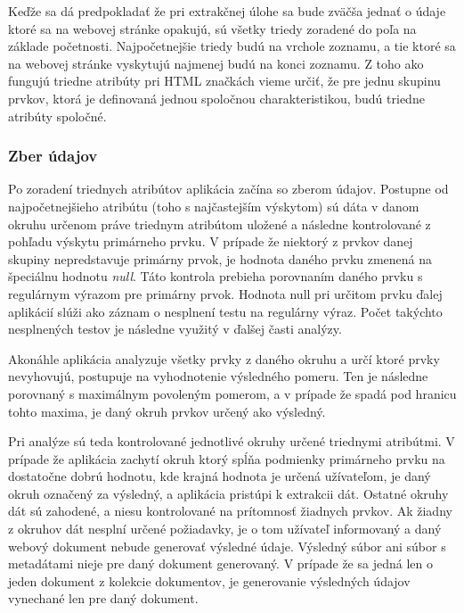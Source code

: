 Keďže sa dá predpokladať že pri extrakčnej úlohe sa bude zväčša jednať o údaje ktoré sa na webovej stránke opakujú, sú všetky triedy zoradené do poľa na základe početnosti. Najpočetnejšie triedy budú na vrchole zoznamu, a tie ktoré sa na webovej stránke vyskytujú najmenej budú na konci zoznamu. Z toho ako fungujú triedne atribúty pri HTML značkách vieme určiť, že pre jednu skupinu prvkov, ktorá je definovaná jednou spoločnou charakteristikou, budú triedne atribúty spoločné. 


\subsubsection{Zber údajov}

Po zoradení triednych atribútov aplikácia začína so zberom údajov. Postupne od najpočetnejšieho atribútu (toho s najčastejším výskytom) sú dáta v danom okruhu určenom práve triednym atribútom uložené a následne kontrolované z pohľadu výskytu primárneho prvku. V prípade že niektorý z prvkov danej skupiny nepredstavuje primárny prvok, je hodnota daného prvku zmenená na špeciálnu hodnotu \textit{null}. Táto kontrola prebieha porovnaním daného prvku s regulárnym výrazom pre primárny prvok. Hodnota null pri určitom prvku ďalej aplikácií slúži ako záznam o nesplnení testu na regulárny výraz. Počet takýchto nesplnených testov je následne využitý v ďalšej časti analýzy.

Akonáhle aplikácia analyzuje všetky prvky z daného okruhu a určí ktoré prvky nevyhovujú, postupuje na vyhodnotenie výsledného pomeru. Ten je následne porovnaný s maximálnym povoleným pomerom, a v prípade že spadá pod hranicu tohto maxima, je daný okruh prvkov určený ako výsledný.

\bigskip

Pri analýze sú teda kontrolované jednotlivé okruhy určené triednymi atribútmi. V prípade že aplikácia zachytí okruh ktorý spĺňa podmienky primárneho prvku na dostatočne dobrú hodnotu, kde krajná hodnota je určená užívateľom, je daný okruh označený za výsledný, a aplikácia pristúpi k extrakcii dát. Ostatné okruhy dát sú zahodené, a niesu kontrolované na prítomnosť žiadnych prvkov. Ak žiadny z okruhov dát nesplní určené požiadavky, je o tom užívateľ informovaný a daný webový dokument nebude generovať výsledné údaje. Výsledný súbor ani súbor s metadátami nieje pre daný dokument generovaný. V prípade že sa jedná len o jeden dokument z kolekcie dokumentov, je generovanie výsledných údajov vynechané len pre daný dokument.

